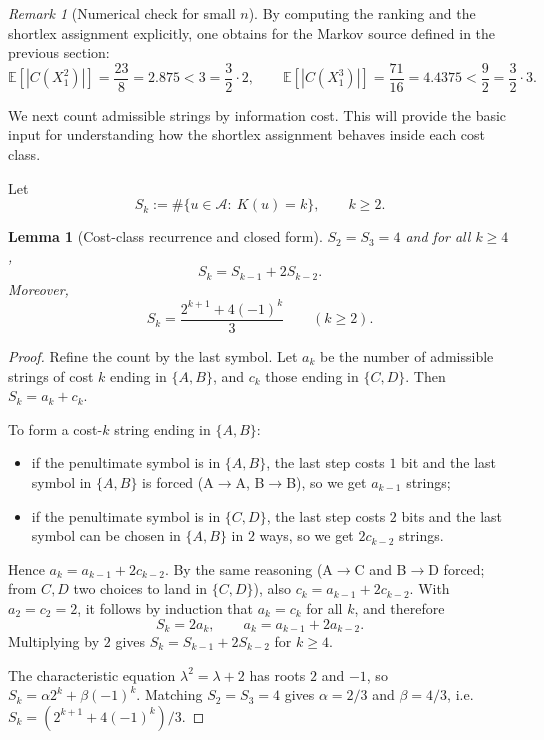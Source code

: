\documentclass[10pt,a4paper]{article}
\newtheorem{lemma}{Lemma}
\theoremstyle{definition}
\theoremstyle{remark}
\newtheorem{remark}{Remark}
\newcommand{\1}{\mathbf{1}}
\begin{document}
\begin{remark}[Numerical check for small $n$]
By computing the ranking and the shortlex assignment explicitly, one obtains for the Markov source defined in the previous section:
\[
\mathbb E[|C(X_1^2)|]=\frac{23}{8}=2.875<3=\frac32\cdot 2,\qquad
\mathbb E[|C(X_1^3)|]=\frac{71}{16}=4.4375<\frac92=\frac32\cdot 3.
\]
\end{remark}

We next count admissible strings by information cost. This will provide the basic input for understanding how the shortlex assignment behaves inside each cost class.

Let
\[
S_k:=\#\{u\in\mathcal A:\ K(u)=k\},\qquad k\ge 2.
\]

\begin{lemma}[Cost-class recurrence and closed form]\label{lem:Sk}
$S_2=S_3=4$ and for all $k\ge 4$,
\[
S_k=S_{k-1}+2S_{k-2}.
\]
Moreover,
\[
S_k=\frac{2^{k+1}+4(-1)^k}{3}\qquad (k\ge 2).
\]
\end{lemma}

\begin{proof}
Refine the count by the last symbol. Let $a_k$ be the number of admissible strings of cost $k$ ending in $\{A,B\}$, and $c_k$ those ending in $\{C,D\}$. Then $S_k=a_k+c_k$.

To form a cost-$k$ string ending in $\{A,B\}$:
\begin{itemize}[leftmargin=2em]
\item if the penultimate symbol is in $\{A,B\}$, the last step costs $1$ bit and the last symbol in $\{A,B\}$ is forced (A$\to$A, B$\to$B), so we get $a_{k-1}$ strings;
\item if the penultimate symbol is in $\{C,D\}$, the last step costs $2$ bits and the last symbol can be chosen in $\{A,B\}$ in $2$ ways, so we get $2c_{k-2}$ strings.
\end{itemize}
Hence $a_k=a_{k-1}+2c_{k-2}$. By the same reasoning (A$\to$C and B$\to$D forced; from $C,D$ two choices to land in $\{C,D\}$), also $c_k=a_{k-1}+2c_{k-2}$. With $a_2=c_2=2$, it follows by induction that $a_k=c_k$ for all $k$, and therefore
\[
S_k=2a_k,\qquad a_k=a_{k-1}+2a_{k-2}.
\]
Multiplying by $2$ gives $S_k=S_{k-1}+2S_{k-2}$ for $k\ge 4$.

The characteristic equation $\lambda^2=\lambda+2$ has roots $2$ and $-1$, so $S_k=\alpha 2^k+\beta(-1)^k$.
Matching $S_2=S_3=4$ gives $\alpha=2/3$ and $\beta=4/3$, i.e. $S_k=(2^{k+1}+4(-1)^k)/3$.
\end{proof}
\end{document}
